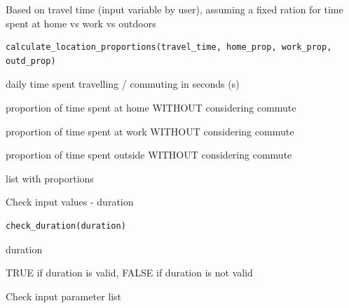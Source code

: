\documentclass[a4paper]{book}
\begin{document}
%
\begin{Description}
Based on travel time (input variable by user), assuming a fixed ration for
time spent at home vs work vs outdoors
\end{Description}
%
\begin{Usage}
\begin{verbatim}
calculate_location_proportions(travel_time, home_prop, work_prop, outd_prop)
\end{verbatim}
\end{Usage}
%
\begin{Arguments}
\begin{ldescription}
\item[\code{travel\_time}] daily time spent travelling / commuting in seconds (s)

\item[\code{home\_prop}] proportion of time spent at home WITHOUT considering commute

\item[\code{work\_prop}] proportion of time spent at work WITHOUT considering commute

\item[\code{outd\_prop}] proportion of time spent outside WITHOUT considering commute
\end{ldescription}
\end{Arguments}
%
\begin{Value}
list with proportions
\end{Value}
%
\begin{Description}
Check input values - duration
\end{Description}
%
\begin{Usage}
\begin{verbatim}
check_duration(duration)
\end{verbatim}
\end{Usage}
%
\begin{Arguments}
\begin{ldescription}
\item[\code{duration}] duration
\end{ldescription}
\end{Arguments}
%
\begin{Value}
TRUE if duration is valid, FALSE if duration is not valid
\end{Value}
%
\begin{Description}
Check input parameter list
\end{Description}
\end{document}
